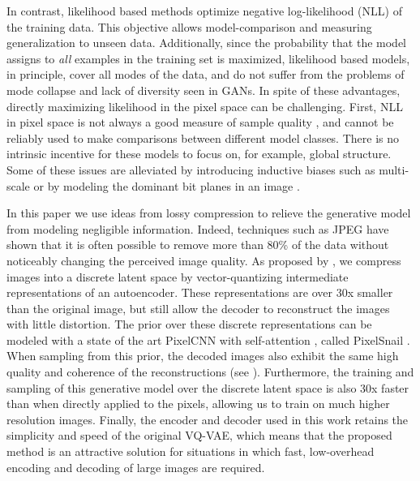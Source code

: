 In contrast, likelihood based methods optimize negative log-likelihood (NLL) of the training data. This objective allows model-comparison and measuring generalization to unseen data. Additionally, since the probability that the model assigns to \emph{all} examples in the training set is maximized, likelihood based models, in principle, cover all modes of the data, and do not suffer from the problems of mode collapse and lack of diversity seen in GANs. In spite of these advantages, directly maximizing likelihood in the pixel space can be challenging. First, NLL in pixel space is not always a good measure of sample quality \cite{Theis2016a}, and cannot be reliably used to make comparisons between different model classes. There is no intrinsic incentive for these models to focus on, for example, global structure. Some of these issues are alleviated by introducing inductive biases such as multi-scale \cite{theis2015generative, PixelRNN, reed2017parallel, SPN} or by modeling the dominant bit planes in an image \cite{kolesnikov2017pixelcnn, kingma2018glow}.



In this paper we use ideas from lossy compression to relieve the generative model from modeling negligible information. Indeed, techniques such as JPEG \cite{wallace1992jpeg} have shown that it is often possible to remove more than 80\% of the data without noticeably changing the perceived image quality. As proposed by \cite{VQVAE}, we compress images into a discrete latent space by vector-quantizing intermediate representations of an autoencoder. These representations are over 30x smaller than the original image, but still allow the decoder to reconstruct the images with little distortion. The prior over these discrete representations can be modeled with a state of the art PixelCNN \cite{PixelRNN, pixelcnn} with self-attention \cite{Vaswani2017}, called PixelSnail \cite{PixelSnail}. When sampling from this prior, the decoded images also exhibit the same high quality and coherence of the reconstructions (see ). Furthermore, the training and sampling of this generative model over the discrete latent space is also 30x faster than when directly applied to the pixels, allowing us to train on much higher resolution images. Finally, the encoder and decoder used in this work retains the simplicity and speed of the original VQ-VAE, which means that the proposed method is an attractive solution for situations in which fast, low-overhead encoding and decoding of large images are required.